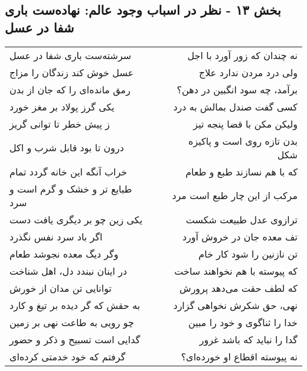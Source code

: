 \begin{center}
\section*{بخش ۱۳ - نظر در اسباب وجود عالم: نهاده‌ست باری شفا در عسل}
\label{sec:013}
\begin{longtable}{l p{0.5cm} r}
سرشته‌ست باری شفا در عسل
&&
نه چندان که زور آورد با اجل
\\
عسل خوش کند زندگان را مزاج
&&
ولی درد مردن ندارد علاج
\\
رمق مانده‌ای را که جان از بدن
&&
برآمد، چه سود انگبین در دهن؟
\\
یکی گرز پولاد بر مغز خورد
&&
کسی گفت صندل بمالش به درد
\\
ز پیش خطر تا توانی گریز
&&
ولیکن مکن با قضا پنجه تیز
\\
درون تا بود قابل شرب و اکل
&&
بدن تازه روی است و پاکیزه شکل
\\
خراب آنگه این خانه گردد تمام
&&
که با هم نسازند طبع و طعام
\\
طبایع تر و خشک و گرم است و سرد
&&
مرکب از این چار طبع است مرد
\\
یکی زین چو بر دیگری یافت دست
&&
ترازوی عدل طبیعت شکست
\\
اگر باد سرد نفس نگذرد
&&
تف معده جان در خروش آورد
\\
وگر دیگ معده نجوشد طعام
&&
تن نازنین را شود کار خام
\\
در اینان نبندد دل، اهل شناخت
&&
که پیوسته با هم نخواهند ساخت
\\
توانایی تن مدان از خورش
&&
که لطف حقت می‌دهد پرورش
\\
به حقش که گر دیده بر تیغ و کارد
&&
نهی، حق شکرش نخواهی گزارد
\\
چو رویی به طاعت نهی بر زمین
&&
خدا را ثناگوی و خود را مبین
\\
گدایی است تسبیح و ذکر و حضور
&&
گدا را نباید که باشد غرور
\\
گرفتم که خود خدمتی کرده‌ای
&&
نه پیوسته اقطاع او خورده‌ای؟
\\
\end{longtable}
\end{center}
